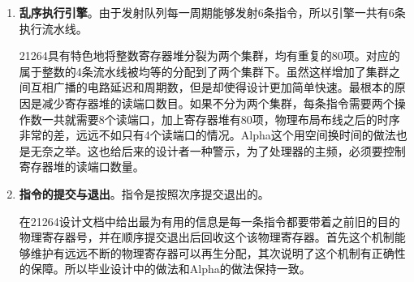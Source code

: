 \begin{enumerate}[label=(\alph*)]
	一个周期最多能够取回4条指令，先锁存一个周期，然后在CAM形式的重命名表中进行重命名和寄存器的分配。需要注意的是，和MIPS一样，Alpha在重命名阶段要特殊处理条件移动指令的映射关系。重命名完毕消除了写后写和读后写的冲突，但是依旧保留了写后读冲突。之后将指令写入发射队列中。发射队列采用分离式，分为整数指令队列和浮点指令队列，最多可以动态发射出6条指令，四条整数指令，两条浮点指令。使用记分牌来判断指令的操作数是否准备就绪。发射的细节上，微结构上有一个20项的定点队列和一个15项的浮点队列，队列只发射的是那些操作数都已经准备好的指令。与此同时，队列由仲裁器来决定填入新的指令。上述模块的逻辑可以由图\ref{fig:rename_21264}来直观的描述。
	\begin{figure}[!htbp]
		\centering
		\texttt{[image: rename]}
		\label{fig:rename_21264}
	\end{figure}
	上图中有一个Saved map state模块，非常重要，它的作用是转移预测错误的恢复处理器状态。注意该表有80项，也即每一条指令分配一项，这样处理器可以从任何一条指令之后精确地恢复状态，而不会受到跳转指令数量的约束。但是缺点是非常消耗资源。当然不光是转移预测错误的恢复，例外中断的状态恢复同样也是用这个表的，但和分支预测错误的恢复机制略有不同。
	\item \textbf{乱序执行引擎}。由于发射队列每一周期能够发射6条指令，所以引擎一共有6条执行流水线。
	
	21264具有特色地将整数寄存器堆分裂为两个集群，均有重复的80项。对应的属于整数的4条流水线被均等的分配到了两个集群下。虽然这样增加了集群之间互相广播的电路延迟和周期数，但是却使得设计更加简单快速。最根本的原因是减少寄存器堆的读端口数目。如果不分为两个集群，每条指令需要两个操作数一共就需要8个读端口，加上寄存器堆有80项，物理布局布线之后的时序非常的差，远远不如只有4个读端口的情况。Alpha这个用空间换时间的做法也是无奈之举。这也给后来的设计者一种警示，为了处理器的主频，必须要控制寄存器堆的读端口数量。
	\item \textbf{指令的提交与退出}。指令是按照次序提交退出的。
	
	在21264设计文档中给出最为有用的信息是每一条指令都要带着之前旧的目的物理寄存器号，并在顺序提交退出后回收这个该物理寄存器。首先这个机制能够维护有远远不断的物理寄存器可以再生分配，其次说明了这个机制有正确性的保障。所以毕业设计中的做法和Alpha的做法保持一致。


\end{enumerate}
